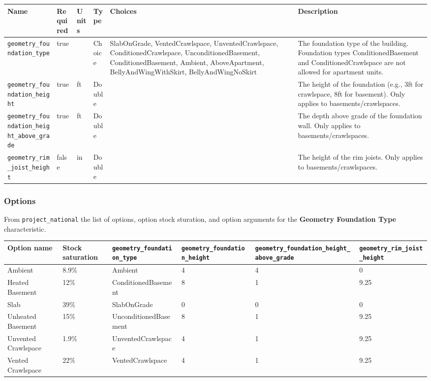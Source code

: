 \begin{longtable}[]{@{}llllll@{}}
\toprule\noalign{}
Name & Required & Units & Type & Choices & Description \\
\midrule\noalign{}
\endhead
\bottomrule\noalign{}
\endlastfoot
\texttt{geometry\_foundation\_type} & true & & Choice & SlabOnGrade,
VentedCrawlspace, UnventedCrawlspace, ConditionedCrawlspace,
UnconditionedBasement, ConditionedBasement, Ambient, AboveApartment,
BellyAndWingWithSkirt, BellyAndWingNoSkirt & The foundation type of the
building. Foundation types ConditionedBasement and ConditionedCrawlspace
are not allowed for apartment units. \\
\texttt{geometry\_foundation\_height} & true & ft & Double & & The
height of the foundation (e.g., 3ft for crawlspace, 8ft for basement).
Only applies to basements/crawlspaces. \\
\texttt{geometry\_foundation\_height\_above\_grade} & true & ft & Double
& & The depth above grade of the foundation wall. Only applies to
basements/crawlspaces. \\
\texttt{geometry\_rim\_joist\_height} & false & in & Double & & The
height of the rim joists. Only applies to basements/crawlspaces. \\
\end{longtable}

\subsubsection{Options}\label{options-54}

From \texttt{project\_national} the list of options, option stock
sturation, and option arguments for the \textbf{Geometry Foundation
Type} characteristic.

\begin{longtable}[]{@{}llllll@{}}
\toprule\noalign{}
Option name & Stock saturation & \texttt{geometry\_foundation\_type} &
\texttt{geometry\_foundation\_height} &
\texttt{geometry\_foundation\_height\_above\_grade} &
\texttt{geometry\_rim\_joist\_height} \\
\midrule\noalign{}
\endhead
\bottomrule\noalign{}
\endlastfoot
Ambient & 8.9\% & Ambient & 4 & 4 & 0 \\
Heated Basement & 12\% & ConditionedBasement & 8 & 1 & 9.25 \\
Slab & 39\% & SlabOnGrade & 0 & 0 & 0 \\
Unheated Basement & 15\% & UnconditionedBasement & 8 & 1 & 9.25 \\
Unvented Crawlspace & 1.9\% & UnventedCrawlspace & 4 & 1 & 9.25 \\
Vented Crawlspace & 22\% & VentedCrawlspace & 4 & 1 & 9.25 \\
\end{longtable}

